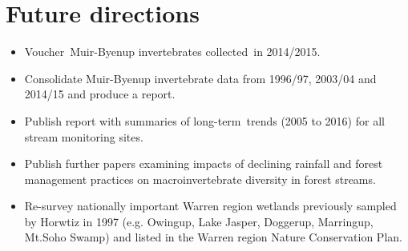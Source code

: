 \documentclass[version=last,
    paper=a4, %
    10pt, %
    usenames,
    dvipsnames,
    oneside, %
    headings=openany, %
    DIV=15 %
]{scrbook}
\begin{document}
\section*{Future directions}

\begin{itemize}
\itemsep1pt\parskip0pt
\item
  Voucher~Muir-Byenup invertebrates collected~in 2014/2015.
\item
  Consolidate Muir-Byenup invertebrate data from 1996/97, 2003/04 and
  2014/15 and produce a report.
\item
  Publish report with summaries of long-term~trends (2005 to 2016) for
  all stream monitoring sites.
\item
  Publish further papers examining impacts of declining rainfall and
  forest management practices on macroinvertebrate diversity in forest
  streams.
\item
  Re-survey nationally important Warren region wetlands previously
  sampled by Horwtiz in 1997 (e.g. Owingup, Lake Jasper, Doggerup,
  Marringup, Mt.Soho Swamp) and listed in the Warren region Nature
  Conservation Plan.
\end{itemize}



\end{document}
